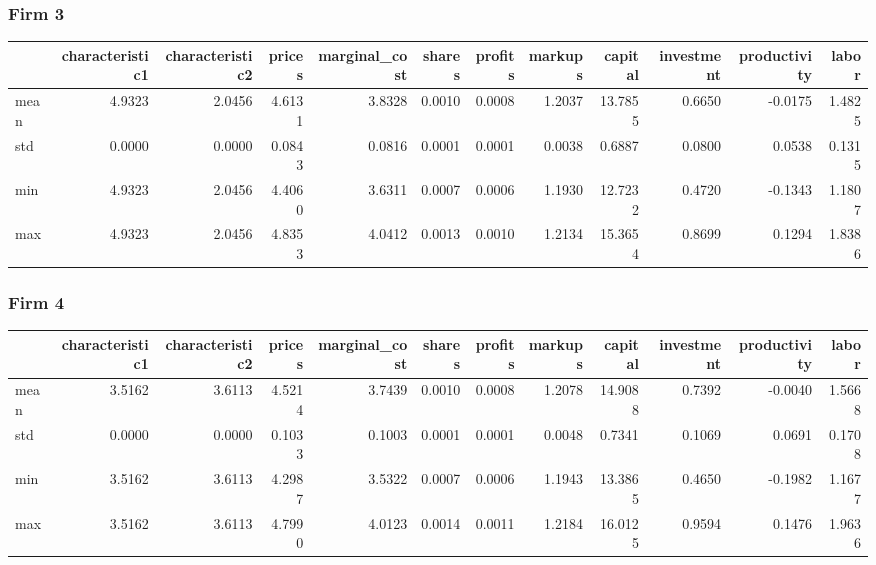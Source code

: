  \subsubsection*{Firm 3}
\begin{tabular}{lrrrrrrrrrrr}
\toprule
{} &  characteristic1 &  characteristic2 &  prices &  marginal\_cost &  shares &  profits &  markups &  capital &  investment &  productivity &  labor \\
\midrule
mean &           4.9323 &           2.0456 &  4.6131 &         3.8328 &  0.0010 &   0.0008 &   1.2037 &  13.7855 &      0.6650 &       -0.0175 & 1.4825 \\
std  &           0.0000 &           0.0000 &  0.0843 &         0.0816 &  0.0001 &   0.0001 &   0.0038 &   0.6887 &      0.0800 &        0.0538 & 0.1315 \\
min  &           4.9323 &           2.0456 &  4.4060 &         3.6311 &  0.0007 &   0.0006 &   1.1930 &  12.7232 &      0.4720 &       -0.1343 & 1.1807 \\
max  &           4.9323 &           2.0456 &  4.8353 &         4.0412 &  0.0013 &   0.0010 &   1.2134 &  15.3654 &      0.8699 &        0.1294 & 1.8386 \\
\bottomrule
\end{tabular}


 \subsubsection*{Firm 4}
\begin{tabular}{lrrrrrrrrrrr}
\toprule
{} &  characteristic1 &  characteristic2 &  prices &  marginal\_cost &  shares &  profits &  markups &  capital &  investment &  productivity &  labor \\
\midrule
mean &           3.5162 &           3.6113 &  4.5214 &         3.7439 &  0.0010 &   0.0008 &   1.2078 &  14.9088 &      0.7392 &       -0.0040 & 1.5668 \\
std  &           0.0000 &           0.0000 &  0.1033 &         0.1003 &  0.0001 &   0.0001 &   0.0048 &   0.7341 &      0.1069 &        0.0691 & 0.1708 \\
min  &           3.5162 &           3.6113 &  4.2987 &         3.5322 &  0.0007 &   0.0006 &   1.1943 &  13.3865 &      0.4650 &       -0.1982 & 1.1677 \\
max  &           3.5162 &           3.6113 &  4.7990 &         4.0123 &  0.0014 &   0.0011 &   1.2184 &  16.0125 &      0.9594 &        0.1476 & 1.9636 \\
\bottomrule
\end{tabular}


